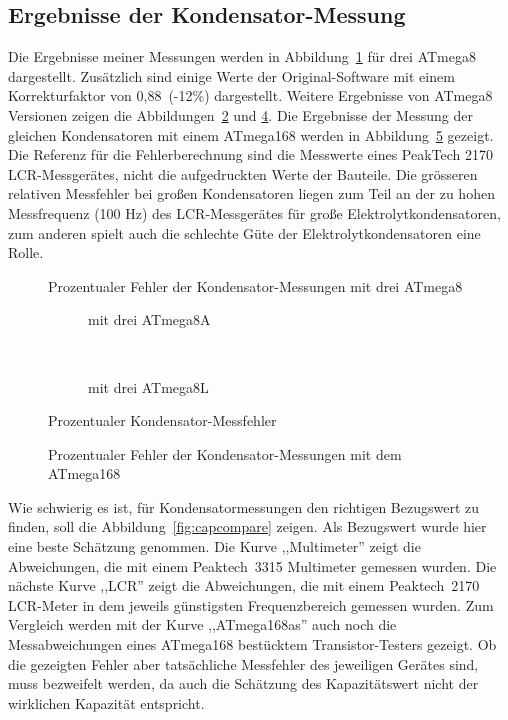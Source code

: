 \subsection{Ergebnisse der Kondensator-Messung}
Die Ergebnisse meiner Messungen werden in Abbildung~\ref{fig:mega8cap} für drei ATmega8 dargestellt.
Zusätzlich sind einige Werte der Original-Software mit einem Korrekturfaktor
von 0,88~(-12\%) dargestellt.
Weitere Ergebnisse von ATmega8 Versionen zeigen die Abbildungen~\ref{fig:mega8Acap} und \ref{fig:mega8Lcap}.
Die Ergebnisse der Messung der gleichen Kondensatoren mit einem ATmega168 werden in Abbildung~\ref{fig:mega168cap} gezeigt.
Die Referenz für die Fehlerberechnung sind die Messwerte eines PeakTech 2170 LCR-Messgerätes, 
 nicht die aufgedruckten Werte der Bauteile.
Die grösseren relativen Messfehler bei großen Kondensatoren liegen zum Teil an der zu hohen Messfrequenz (100 Hz) des
LCR-Messgerätes für große Elektrolytkondensatoren, zum anderen spielt auch die schlechte Güte der
Elektrolytkondensatoren eine Rolle.

\begin{figure}[H]
\centering

\caption{Prozentualer Fehler der Kondensator-Messungen mit drei ATmega8}
\label{fig:mega8cap}
\end{figure}

\begin{figure}[H]
  \begin{subfigure}[b]{9cm}
    \centering
    \resizebox{9cm}{!}{}
    \caption{mit drei ATmega8A}
    \label{fig:mega8Acap}
  \end{subfigure}
  ~
  \begin{subfigure}[b]{9cm}
    \centering
    \resizebox{9cm}{!}{}
    \caption{mit drei ATmega8L}
    \label{fig:mega8Lcap}
  \end{subfigure}
  \caption{Prozentualer Kondensator-Messfehler}
\end{figure}

\begin{figure}[H]
\centering

\caption{Prozentualer Fehler der Kondensator-Messungen mit dem ATmega168}
\label{fig:mega168cap}
\end{figure}

Wie schwierig es ist, für Kondensatormessungen den richtigen Bezugswert zu finden, soll die Abbildung~\ref{fig:capcompare} zeigen.
Als Bezugswert wurde hier eine beste Schätzung genommen. Die Kurve ,,Multimeter'' zeigt die Abweichungen, die mit einem
Peaktech~3315 Multimeter gemessen wurden.
Die nächste Kurve ,,LCR'' zeigt die Abweichungen, die mit einem Peaktech~2170 LCR-Meter in dem jeweils günstigsten Frequenzbereich gemessen wurden.
Zum Vergleich werden mit der Kurve ,,ATmega168as'' auch noch die Messabweichungen eines ATmega168 bestücktem Transistor-Testers gezeigt.
Ob die gezeigten Fehler aber tatsächliche Messfehler des jeweiligen Gerätes sind, muss bezweifelt werden, da auch die
Schätzung des Kapazitätswert nicht der wirklichen Kapazität entspricht.

